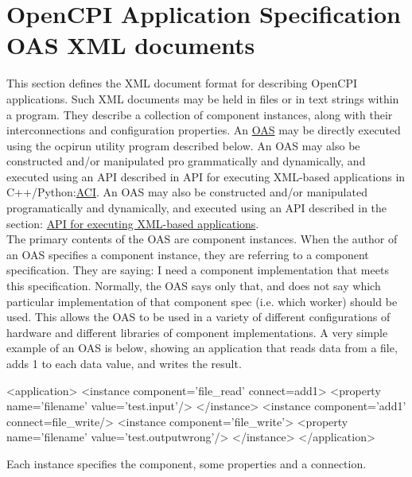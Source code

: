 \documentclass[10pt, a4paper, oneside]{article}
\renewcommand\_{\textunderscore\allowbreak} %
\begin{document}
\section{OpenCPI Application Specification OAS XML documents}
This section defines the XML document format for describing OpenCPI applications. Such XML documents may be held in files or in text strings within a program. They describe a collection of component instances, along with their interconnections and configuration properties. An \hyperlink{OAS}{OAS} may be directly executed using the ocpirun utility program described below. An OAS may also be constructed and/or manipulated pro grammatically and dynamically, and executed using an API described in API for executing XML-based applications in C++/Python:\hyperlink{ACI}{ACI}. An OAS may also be constructed and/or manipulated programatically and dynamically, and executed using an API described in the section: \hyperlink{sec:API for executing XML-based applications}{API for executing XML-based applications}.\\


The primary contents of the OAS are component instances. When the author of an OAS specifies a component instance, they are referring to a component specification. They are saying: I need a component implementation that meets this specification. Normally, the OAS says only that, and does not say which particular implementation of that component spec (i.e. which worker) should be used. This allows the OAS to be used in a variety of different configurations of hardware and different libraries of component implementations. A very simple example of an OAS is below, showing an application that reads data from a file, adds 1 to each data value, and writes the result.\begin{ocpixml}
<application>
	<instance component='file_read' connect=add1>
		<property name='filename' value='test.input'/>
	</instance>
	<instance component='add1' connect=file_write/>
	<instance component='file_write'>
		<property name='filename' value='test.outputwrong'/>
	</instance>
</application>
\end{ocpixml}

Each instance specifies the component, some properties and a connection.
\end{document}
